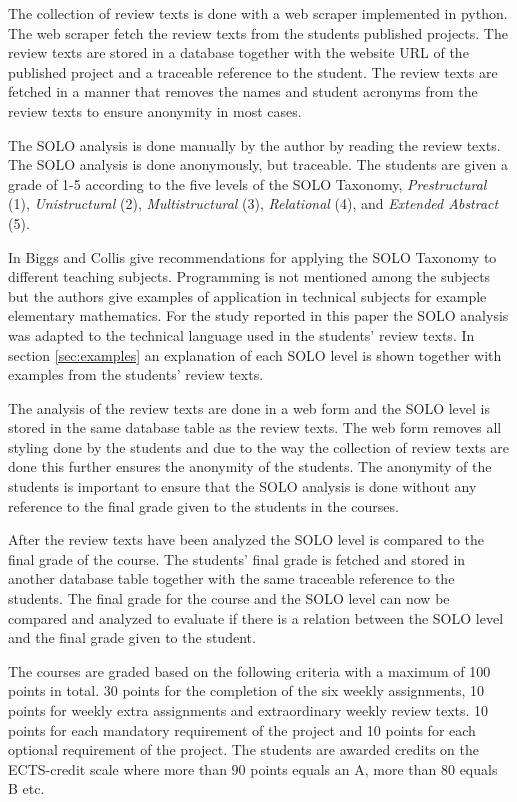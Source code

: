 \documentclass[twoside,twocolumn,a4paper,11pt,english]{article}
\begin{document}
The collection of review texts is done with a web scraper implemented in python. The web scraper fetch the review texts from the students published projects. The review texts are stored in a database together with the website URL of the published project and a traceable reference to the student. The review texts are fetched in a manner that removes the names and student acronyms from the review texts to ensure anonymity in most cases.

The SOLO analysis is done manually by the author by reading the review texts. The SOLO analysis is done anonymously, but traceable. The students are given a grade of 1-5 according to the five levels of the SOLO Taxonomy, \textit{Prestructural} (1), \textit{Unistructural} (2), \textit{Multistructural} (3), \textit{Relational} (4), and \textit{Extended Abstract} (5).

In \cite{biggs1982evaluation} Biggs and Collis give recommendations for applying the SOLO Taxonomy to different teaching subjects. Programming is not mentioned among the subjects but the authors give examples of application in technical subjects for example elementary mathematics. For the study reported in this paper the SOLO analysis was adapted to the technical language used in the students' review texts. In section \ref{sec:examples} an explanation of each SOLO level is shown together with examples from the students' review texts.

The analysis of the review texts are done in a web form and the SOLO level is stored in the same database table as the review texts. The web form removes all styling done by the students and due to the way the collection of review texts are done this further ensures the anonymity of the students. The anonymity of the students is important to ensure that the SOLO analysis is done without any reference to the final grade given to the students in the courses.

After the review texts have been analyzed the SOLO level is compared to the final grade of the course. The students' final grade is fetched and stored in another database table together with the same traceable reference to the students. The final grade for the course and the SOLO level can now be compared and analyzed to evaluate if there is a relation between the SOLO level and the final grade given to the student.

The courses are graded based on the following criteria with a maximum of 100 points in total. 30 points for the completion of the six weekly assignments, 10 points for weekly extra assignments and extraordinary weekly review texts. 10 points for each mandatory requirement of the project and 10 points for each optional requirement of the project. The students are awarded credits on the ECTS-credit scale where more than 90 points equals an A, more than 80 equals B etc.
\end{document}
